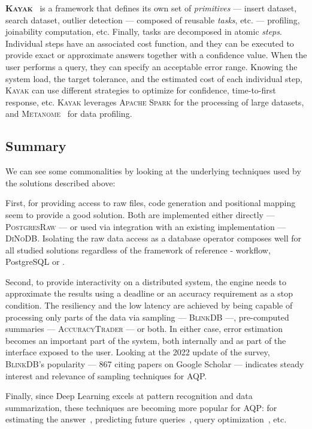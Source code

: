 \medskip

\textbf{\textsc{Kayak}}~\cite{10.14778/3137765.3137792} is a framework that defines its own
set of \textit{primitives} --- insert dataset, search dataset, outlier detection --- composed of 
reusable \textit{tasks}, etc. --- profiling, joinability computation, etc. Finally, tasks
are decomposed in atomic \textit{steps}.
Individual steps have an associated cost function, and they can be executed to provide exact
or approximate answers together with a confidence value. When the user performs a query, they can
specify an acceptable error range. Knowing the system load, the target tolerance, and the estimated
cost of each individual step, \textsc{Kayak} can use different strategies to optimize for confidence,
time-to-first response, etc.
\textsc{Kayak} leverages \textsc{Apache Spark} for the processing of
large datasets, and \textsc{Metanome}~\cite{papenbrock2015data} for data profiling.

\subsection{Summary}
We can see some commonalities by looking at the underlying techniques used by the 
solutions described above:

First, for providing access to raw files, code generation and positional 
mapping seem to provide a good solution. Both are implemented either directly --- 
\textsc{PostgresRaw} --- or used via integration with an existing implementation --- \textsc{DiNoDB}.
Isolating the raw data access as a database operator composes well for all 
studied solutions regardless of the framework of reference - workflow, 
PostgreSQL or \scidb.

Second, to provide interactivity on a distributed system, the engine 
needs to approximate the results using a deadline or an accuracy requirement as 
a stop condition. The resiliency and the low latency are achieved by 
being capable of processing only parts of the data via sampling --- \textsc{BlinkDB} ---, 
pre-computed summaries --- \textsc{AccuracyTrader} --- or both. In either case, error 
estimation becomes an important part of the system, both internally and as 
part of the interface exposed to the user.
Looking at the 2022 update of the survey, \textsc{BlinkDB}'s popularity --- 867 citing papers
on Google Scholar --- indicates steady interest and relevance of sampling techniques for \gls{AQP}.

Finally, since Deep Learning excels at pattern recognition and data summarization,
these techniques are becoming more popular for \gls{AQP}: for estimating the 
answer~\cite{regev_approximating_2021,9101822}, predicting
future queries~\cite{10020614,10.1145/3442338}, query optimization~\cite{bi_learning-based_2022},
etc.

